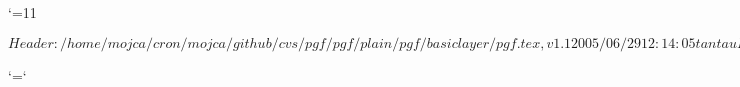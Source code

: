 %

\edef\pgfatcode{\the\catcode`\@}
\catcode`\@=11



\ProvidesPackageRCS $Header: /home/mojca/cron/mojca/github/cvs/pgf/pgf/plain/pgf/basiclayer/pgf.tex,v 1.1 2005/06/29 12:14:05 tantau Exp $






\catcode`\@=\pgfatcode

\endinput
